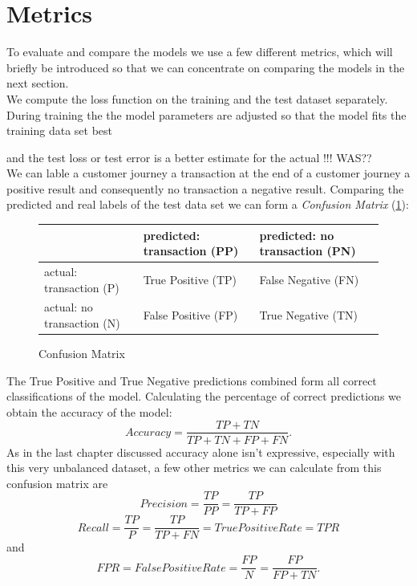 \section{Metrics}
To evaluate and compare the models we use a few different metrics, which will briefly be introduced so that we can concentrate on comparing the models in the next section. \\
We compute the loss function on the training and the test dataset separately. 
During training the the model parameters are adjusted so that the model fits the training data set best 


and the test loss or test error is a better estimate for the actual \color{red} !!! WAS?? \color{black} \\
We can lable a customer journey  a transaction at the end of a customer journey a positive result and consequently no transaction a negative result. 
Comparing the predicted and real labels of the test data set we can form a \textit{Confusion Matrix} (\ref{fig:conf_mat}):\\
\begin{figure}[h]
\begin{center}
\centering
\begin{tabular}{ |m{4cm}||m{2.8cm}|m{2.8cm}| } 
  \hline 
   & predicted: transaction (PP) & predicted:\hspace{1cm} no transaction (PN) \\ 
  \hline \hline
  actual:\hspace{2cm}  transaction (P) & True Positive (TP) & False Negative (FN) \\
  \hline
  actual:\hspace{3cm}  no transaction (N) & False Positive (FP) & True Negative (TN)  \\ 
  \hline
\end{tabular}
\end{center}
    \caption{Confusion Matrix}
    \label{fig:conf_mat}
\end{figure}
The True Positive and True Negative predictions combined form all correct classifications of the model. Calculating the percentage of correct predictions we obtain the accuracy of the model: $$Accuracy=\frac{TP+TN}{TP+TN+FP+FN}.$$
As in the last chapter discussed accuracy alone isn't expressive, especially with this very unbalanced dataset, a few other metrics we can calculate from this confusion matrix are 
$$Precision=\frac{TP}{PP}=\frac{TP}{TP+FP}$$
$$Recall=\frac{TP}{P}=\frac{TP}{TP+FN} = TruePositiveRate = TPR$$
and
$$FPR = FalsePositiveRate = \frac{FP}{N} = \frac{FP}{FP + TN}.$$

